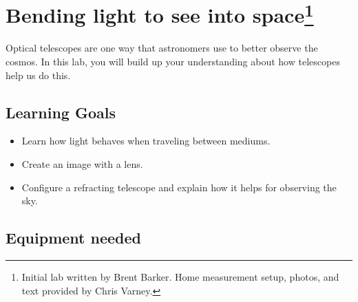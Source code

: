 \chapter[Bending light to see into space]{Bending light to see into space\footnote{Initial lab written by Brent Barker. Home measurement setup, photos, and text provided by Chris Varney.}}


Optical telescopes are one way that astronomers use to better observe the cosmos. In this lab, you will build up your understanding about how telescopes help us do this.

\section{Learning Goals}

\begin{itemize}
	\item Learn how light behaves when traveling between mediums.
	
	\item Create an image with a lens.
	
	\item Configure a refracting telescope and explain how it helps for observing the sky.
\end{itemize}

\section{Equipment needed}

